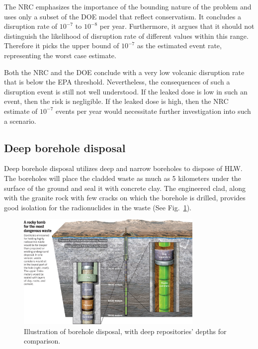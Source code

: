 \documentclass[nofootinbib,preprint,aps]{revtex4-1}
\begin{document}
        The NRC emphasizes the importance of the bounding nature of the problem and uses only a subset
        of the DOE model that reflect conservatism. It concludes a disruption rate of
        $10^{-7}$ to $10^{-8}$ per year. Furthermore, it argues that it should not distinguish the likelihood
        of disruption rate of different values within this range. Therefore it picks the upper bound
        of $10^{-7}$ as the estimated event rate, representing the worst case estimate.

        Both the NRC and the DOE conclude with a very low volcanic disruption rate that is below the EPA
        threshold. Nevertheless, the consequences of such a disruption event is still not well understood.
        If the leaked dose is low in such an event, then the risk is negligible. If the leaked dose is high,
        then the NRC estimate of $10^{-7}$ events per year would necessitate further investigation into such
        a scenario.\cite{cv14}
        \subsection{Deep borehole disposal}
        Deep borehole disposal utilizes deep and narrow boreholes to dispose of HLW. The boreholes
        will place the cladded waste as much as 5 kilometers under the surface of the ground and seal it
        with concrete clay.
        The engineered clad, along with the granite rock with few cracks on which the borehole is drilled,
        provides
        good isolation for the radionuclides in the waste (See Fig.~\ref{fig:borehole}).
        \begin{figure}[h]
            \centering
            \includegraphics[width=0.8\textwidth]{borehole.jpg}
            \caption{Illustration of borehole disposal, with deep repositories' depths for comparison.\cite{c15}}
            \label{fig:borehole}
        \end{figure}
\end{document}
